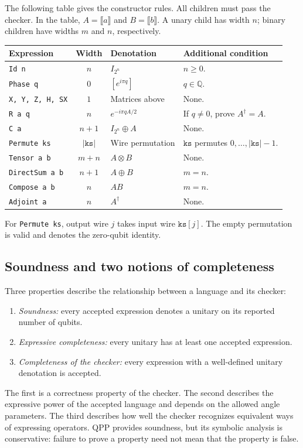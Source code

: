 \documentclass[11pt,a4paper]{article}
\newcommand{\Q}{\mathbb Q}
\newcommand{\sem}[1]{\llbracket #1\rrbracket}
\newcommand{\code}[1]{\texttt{#1}}
\begin{document}
The following table gives the constructor rules. All children must pass
the checker. In the table, $A=\sem a$ and
$B=\sem b$. A unary child has width $n$; binary children have widths
$m$ and $n$, respectively.
\begin{center}
\small
\begin{tabularx}{\linewidth}{@{}lclL@{}}
\toprule
Expression & Width & Denotation & Additional condition\\
\midrule
\code{Id n} & $n$ & $I_{2^n}$ & $n\geq0$.\\
\code{Phase q} & $0$ & $[e^{i\pi q}]$ & $q\in\Q$.\\
\code{X, Y, Z, H, SX} & $1$ & Matrices above & None.\\
\code{R a q} & $n$ & $e^{-i\pi qA/2}$ & If $q\ne0$, prove $A^\dagger=A$.\\
\code{C a} & $n+1$ & $I_{2^n}\oplus A$ & None.\\
\code{Permute ks} & $|\code{ks}|$ & Wire permutation & $\code{ks}$ permutes $0,\ldots,|\code{ks}|-1$.\\
\code{Tensor a b} & $m+n$ & $A\otimes B$ & None.\\
\code{DirectSum a b} & $n+1$ & $A\oplus B$ & $m=n$.\\
\code{Compose a b} & $n$ & $AB$ & $m=n$.\\
\code{Adjoint a} & $n$ & $A^\dagger$ & None.\\
\bottomrule
\end{tabularx}
\end{center}
For \code{Permute ks}, output wire $j$ takes input wire
$\code{ks}[j]$. The empty permutation is valid and denotes the
zero-qubit identity.

\subsection{Soundness and two notions of completeness}

Three properties describe the relationship between a language and its checker:
\begin{enumerate}
\item \emph{Soundness:} every accepted expression denotes a unitary
on its reported number of qubits.
\item \emph{Expressive completeness:} every unitary has at least one
accepted expression.
\item \emph{Completeness of the checker:} every expression with a
well-defined unitary denotation is accepted.
\end{enumerate}
The first is a correctness property of the checker. The second describes
the expressive power of the accepted language and depends on the allowed
angle parameters. The third describes how well the checker recognizes
equivalent ways of expressing operators. QPP provides soundness, but its
symbolic analysis is conservative: failure to prove a property need not
mean that the property is false.
\end{document}
